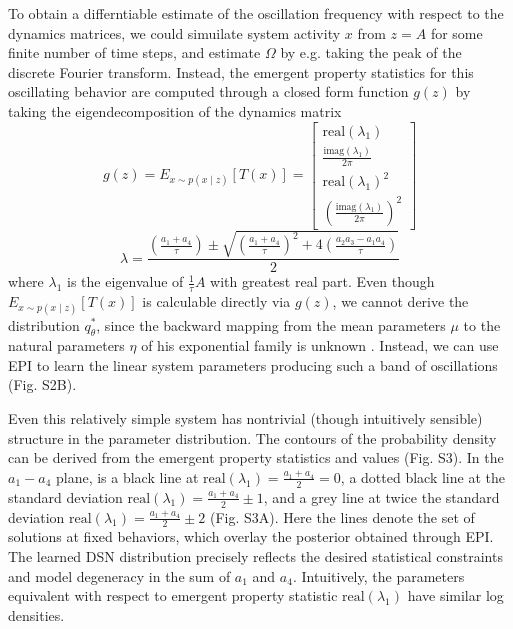 \documentclass[11pt]{article}
\begin{document}
To obtain a differntiable estimate of the oscillation frequency with respect to the dynamics matrices, we could simuilate system activity $x$ from $z=A$ for some finite number of time steps, and estimate $\Omega$ by e.g. taking the peak of the discrete Fourier transform.  Instead, the emergent property statistics for this oscillating behavior are computed through a closed form function $g(z)$ by taking the eigendecomposition of the dynamics matrix
\begin{equation}
g(z) = E_{x\sim p(x \mid z)}\left[T(x)\right] =  \begin{bmatrix} \text{real}(\lambda_1) \\ \frac{\text{imag}(\lambda_1)}{2 \pi} \\ \text{real}(\lambda_1)^2 \\ (\frac{\text{imag}(\lambda_1)}{2 \pi})^2 \end{bmatrix}
\end{equation}
\begin{equation}
\lambda = \frac{(\frac{a_1 + a_4}{\tau}) \pm \sqrt{(\frac{a_1+a_4}{\tau})^2 + 4(\frac{a_2 a_3 - a_1 a_4}{\tau})}}{2}
\end{equation}
where $\lambda_1$ is the eigenvalue of $\frac{1}{\tau}A$ with greatest real part.
Even though $E_{x\sim p(x \mid z)}\left[T(x)\right]$ is calculable directly via $g(z)$, we cannot derive the distribution $q^*_\theta$, since the backward mapping from the mean parameters $\mu$ to the natural parameters $\eta$ of his exponential family is unknown \cite{wainwright2008graphical}.  Instead, we can use EPI to learn the linear system parameters producing such a band of oscillations (Fig. S2B). 

Even this relatively simple system has nontrivial (though intuitively sensible) structure in the parameter distribution.  The contours of the probability density can be derived from the emergent property statistics and values (Fig. S3).  In the $a_1-a_4$ plane, is a black line at $\text{real}(\lambda_1) = \frac{a_1 + a_4}{2} = 0$, a dotted black line at
the standard deviation $\text{real}(\lambda_1) = \frac{a_1 + a_4}{2} \pm 1$, and a grey line at twice the standard deviation
$\text{real}(\lambda_1) = \frac{a_1 + a_4}{2} \pm 2 $ (Fig. S3A).  Here the lines denote the set of solutions at fixed behaviors, which overlay the posterior obtained through EPI.  The learned DSN distribution precisely reflects the desired statistical constraints and model degeneracy in the sum of
$a_1$ and $a_4$. Intuitively, the parameters equivalent with respect to emergent property statistic $\text{real}(\lambda_1)$ have similar log densities.
\end{document}
